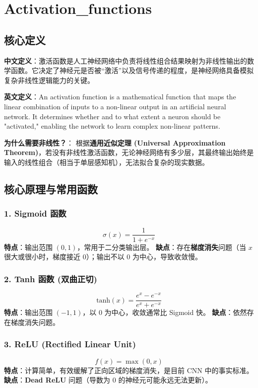 \documentclass[12pt, a4paper]{book}
\begin{document}
\tableofcontents
\newpage
\chapter{Activation\_functions}


\section{核心定义}
\textbf{中文定义}：激活函数是人工神经网络中负责将线性组合结果映射为非线性输出的数学函数。它决定了神经元是否被“激活”以及信号传递的程度，是神经网络具备模拟复杂非线性逻辑能力的关键。

\textbf{英文定义}：An activation function is a mathematical function that maps the linear combination of inputs to a non-linear output in an artificial neural network. It determines whether and to what extent a neuron should be "activated," enabling the network to learn complex non-linear patterns.

\textbf{为什么需要非线性？}：
根据\textbf{通用近似定理 (Universal Approximation Theorem)}，若没有非线性激活函数，无论神经网络有多少层，其最终输出始终是输入的线性组合（相当于单层感知机），无法拟合复杂的现实数据。

\section{核心原理与常用函数}

\subsection{1. Sigmoid 函数}
$$ \sigma(x) = \frac{1}{1 + e^{-x}} $$
\textbf{特点}：输出范围 $(0, 1)$，常用于二分类输出层。
\textbf{缺点}：存在\textbf{梯度消失}问题（当 $x$ 很大或很小时，梯度接近 0）；输出不以 0 为中心，导致收敛慢。

\subsection{2. Tanh 函数 (双曲正切)}
$$ \text{tanh}(x) = \frac{e^x - e^{-x}}{e^x + e^{-x}} $$
\textbf{特点}：输出范围 $(-1, 1)$，以 0 为中心，收敛通常比 Sigmoid 快。
\textbf{缺点}：依然存在梯度消失问题。

\subsection{3. ReLU (Rectified Linear Unit)}
$$ f(x) = \max(0, x) $$
\textbf{特点}：计算简单，有效缓解了正向区域的梯度消失，是目前 CNN 中的事实标准。
\textbf{缺点}：\textbf{Dead ReLU} 问题（导数为 0 的神经元可能永远无法更新）。
\end{document}
